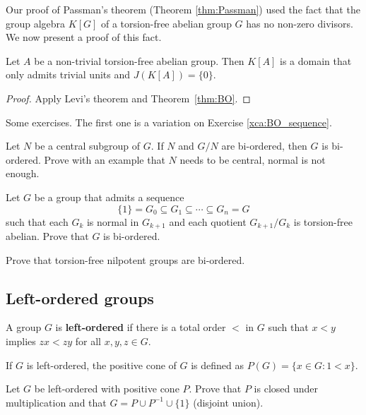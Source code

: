 Our proof of Passman's theorem (Theorem \ref{thm:Passman}) 
used the fact that the group algebra $K[G]$ of
a torsion-free abelian group $G$ has no non-zero divisors. 
We now present a proof of this fact. 

\begin{corollary}
\label{cor:domain_G_abelian}
	Let $A$ be a non-trivial torsion-free abelian group. Then $K[A]$ 
	is a domain that only admits trivial units and $J(K[A])=\{0\}$. 
\end{corollary}

\begin{proof}
	Apply Levi's theorem and Theorem~\ref{thm:BO}.
\end{proof}

Some exercises. The first one is a variation on Exercise \ref{xca:BO_sequence}.

\begin{exercise}
    Let $N$ be a central subgroup of $G$. If $N$ and $G/N$ are bi-ordered, 
    then $G$ is bi-ordered. Prove with an example that $N$ needs to be central, normal 
    is not enough. 
\end{exercise}

\begin{exercise}
    Let $G$ be a group that admits 
    a sequence 
    \[
    \{1\}=G_0\subseteq G_1\subseteq\cdots\subseteq G_n=G
    \]
    such that
    each $G_k$ is normal in $G_{k+1}$ and each quotient $G_{k+1}/G_k$ is 
    torsion-free abelian. Prove that $G$ is bi-ordered.  
\end{exercise}

\begin{exercise}
    Prove that torsion-free nilpotent groups are bi-ordered. 
\end{exercise}


\subsection{Left-ordered groups}

\begin{definition}
	A group $G$ is \textbf{left-ordered} if there is a total order 
	$<$ in $G$ such that $x<y$ implies $zx<zy$ for all $x,y,z\in G$.
\end{definition}

If $G$ is left-ordered, the positive cone of $G$ is defined as $P(G)=\{x\in G:1<x\}$. 

\begin{exercise}
	Let $G$ be left-ordered with positive cone $P$. Prove that 
	$P$ is closed under multiplication and that 
	$G=P\cup P^{-1}\cup \{1\}$ (disjoint union).
\end{exercise}

